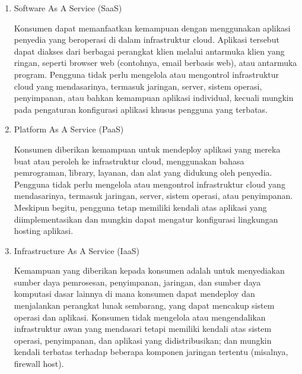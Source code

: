 \begin{enumerate}
    \item Software As A Service (SaaS)

    Konsumen dapat memanfaatkan kemampuan dengan menggunakan aplikasi penyedia yang beroperasi di dalam infrastruktur cloud. Aplikasi tersebut dapat diakses dari berbagai perangkat klien melalui antarmuka klien yang ringan, seperti browser web (contohnya, email berbasis web), atau antarmuka program. Pengguna tidak perlu mengelola atau mengontrol infrastruktur cloud yang mendasarinya, termasuk jaringan, server, sistem operasi, penyimpanan, atau bahkan kemampuan aplikasi individual, kecuali mungkin pada pengaturan konfigurasi aplikasi khusus pengguna yang terbatas.

    
    \item Platform As A Service (PaaS)

    Konsumen diberikan kemampuan untuk mendeploy aplikasi yang mereka buat atau peroleh ke infrastruktur cloud, menggunakan bahasa pemrograman, \f{library}, layanan, dan alat yang didukung oleh penyedia. Pengguna tidak perlu mengelola atau mengontrol infrastruktur cloud yang mendasarinya, termasuk jaringan, server, sistem operasi, atau penyimpanan. Meskipun begitu, pengguna tetap memiliki kendali atas aplikasi yang diimplementasikan dan mungkin dapat mengatur konfigurasi lingkungan hosting aplikasi.

    
    \item Infrastructure As A Service (IaaS)

    Kemampuan yang diberikan kepada konsumen adalah untuk menyediakan sumber daya pemrosesan, penyimpanan, jaringan, dan sumber daya komputasi dasar lainnya di mana konsumen dapat mendeploy dan menjalankan perangkat lunak sembarang, yang dapat mencakup sistem operasi dan aplikasi. Konsumen tidak mengelola atau mengendalikan infrastruktur awan yang mendasari tetapi memiliki kendali atas sistem operasi, penyimpanan, dan aplikasi yang didistribusikan; dan mungkin kendali terbatas terhadap beberapa komponen jaringan tertentu (misalnya, firewall host).
\end{enumerate}


